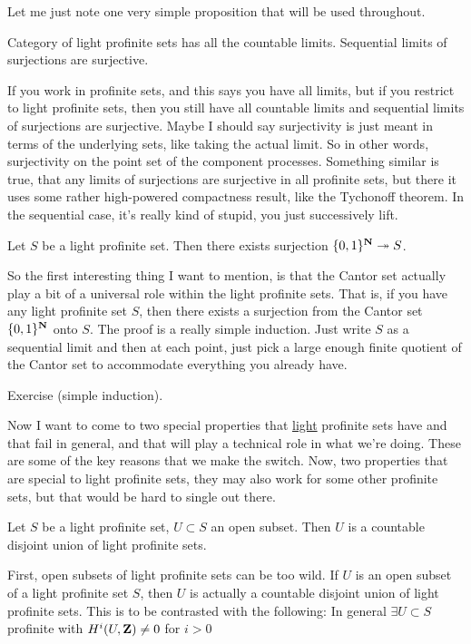 Let me just note one very simple proposition that will be used throughout. 
\begin{proposition}

Category of light profinite sets has all the countable limits. Sequential limits of surjections are surjective.

\end{proposition}

If you work in profinite sets, and this says you have all limits, but if you restrict to light profinite sets, then you still have all countable limits and sequential limits of surjections are surjective. Maybe I should say surjectivity is just meant in terms of the underlying sets, like taking the actual limit. So in other words, surjectivity on the point set of the component processes. 
Something similar is true, that any limits of surjections are surjective in all profinite sets, but there it uses some rather high-powered compactness result, like the Tychonoff theorem. In the sequential case, it's really kind of stupid, you just successively lift.

\begin{proposition}
Let $S$ be a light profinite set. Then there exists surjection $\{ 0,1 \}^\mathbf N \twoheadrightarrow S$.
\end{proposition}
So the first interesting thing I want to mention, is that the Cantor set actually play a bit of a universal role within the light profinite sets. That is, if you have any light profinite set $S$, then there exists a surjection from the Cantor set $\{ 0,1 \}^\mathbf N$ onto $S$. 
The proof is a really simple induction. Just write $S$ as a sequential limit and then at each point, just pick a large enough finite quotient of the Cantor set to accommodate everything you already have.

\begin{sketch}
Exercise (simple induction).
\end{sketch}

Now I want to come to two special properties that \underline{light} profinite sets have and that fail in general, and that will play a technical role in what we're doing. These are some of the key reasons that we make the switch. Now, two properties that are special to light profinite sets, they may also work for some other profinite sets, but that would be hard to single out there.

\begin{proposition}
Let $S$ be a light profinite set, $U \subset S$ an open subset.
Then $U$ is a countable disjoint union of light profinite sets.
\end{proposition}
First, open subsets of light profinite sets can be too wild. If $U$ is an open subset of a light profinite set $S$, then $U$ is actually a countable disjoint union of light profinite sets. This is to be contrasted with the following: 
In general $\exists U \subset S$ profinite with $H^i (U, \mathbf Z) \neq 0$ for $i >0$

